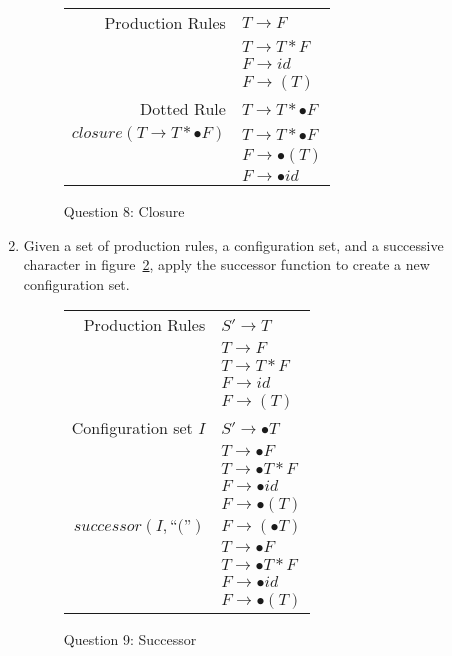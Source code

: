 \documentclass[10pt, oneside, letterpaper]{article}
\begin{document}
\begin{enumerate}
\begin{figure}[!htb]
	\caption{Question 8: Closure}
	\label{tab:q8-closure}
	\begin{center}
		\begin{tabular}{ r | l }
			Production Rules
			& $T \rightarrow F$ \\
			& $T \rightarrow T*F$ \\
			& $F \rightarrow id$ \\
			& $F \rightarrow (T)$ \\
			\hline
			Dotted Rule
			& $T \rightarrow T * \bullet F$ \\
			\hline
			\hline
			$closure(T \rightarrow T * \bullet F)$
			& $T \rightarrow T * \bullet F$ \\
			& $F \rightarrow \bullet (T)$ \\
			& $F \rightarrow \bullet id$
		\end{tabular}
	\end{center}
\end{figure}

		\clearpage

		\item Given a set of production rules, a configuration set, and a successive character in figure~\ref{tab:q9-successor}, apply the successor function to create a new configuration set.

\begin{figure}[!htb]
	\caption{Question 9: Successor}
	\label{tab:q9-successor}
	\begin{center}
		\begin{tabular}{ r | l }
			Production Rules
			& $S' \rightarrow T$ \\
			& $T \rightarrow F$ \\
			& $T \rightarrow T*F$ \\
			& $F \rightarrow id$ \\
			& $F \rightarrow (T)$ \\
			\hline
			Configuration set $I$
			& $S'\rightarrow \bullet T$ \\
			& $T \rightarrow \bullet F$ \\
			& $T \rightarrow \bullet T * F$ \\
			& $F \rightarrow \bullet id$ \\
			& $F \rightarrow \bullet (T)$ \\
			\hline
			\hline
			$successor(I, \textrm{``(''})$
			& $F \rightarrow (\bullet T)$ \\
			& $T \rightarrow \bullet F$ \\
			& $T \rightarrow \bullet T * F$ \\
			& $F \rightarrow \bullet id$ \\
			& $F \rightarrow \bullet (T)$
		\end{tabular}
	\end{center}
\end{figure}


\end{enumerate}
\end{document}
